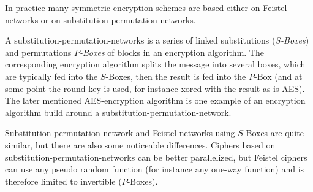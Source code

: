  In practice many symmetric encryption schemes are based either on Feistel networks or on substitution-permutation-networks. 
 \begin{definition}
  A substitution-permutation-networks is a series of linked substitutions (\emph{$S$-Boxes}) and permutations \emph{$P$-Boxes} of blocks in an encryption algorithm. 
  The corresponding encryption algorithm splits the message into several boxes, which are typically fed into the $S$-Boxes, then the result is fed into the $P$-Box (and at some point the round key is used, for instance xored with the result as is AES). The later mentioned AES-encryption algorithm is one example of an encryption algorithm build around a substitution-permutation-network.
 \end{definition}
 Substitution-permutation-network and Feistel networks using $S$-Boxes are quite similar, but there are also some noticeable differences. Ciphers based on substitution-permutation-networks can be better parallelized, but Feistel ciphers can use any pseudo random function (for instance any one-way function) and is therefore limited to invertible ($P$-Boxes). %

